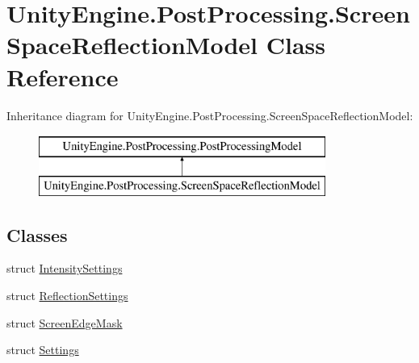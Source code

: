 \hypertarget{class_unity_engine_1_1_post_processing_1_1_screen_space_reflection_model}{}\section{Unity\+Engine.\+Post\+Processing.\+Screen\+Space\+Reflection\+Model Class Reference}
\label{class_unity_engine_1_1_post_processing_1_1_screen_space_reflection_model}
Inheritance diagram for Unity\+Engine.\+Post\+Processing.\+Screen\+Space\+Reflection\+Model\+:\begin{figure}[H]
\begin{center}
\leavevmode
\includegraphics[height=2.000000cm]{class_unity_engine_1_1_post_processing_1_1_screen_space_reflection_model}
\end{center}
\end{figure}
\subsection*{Classes}
\begin{DoxyCompactItemize}
\item 
struct \mbox{\hyperlink{struct_unity_engine_1_1_post_processing_1_1_screen_space_reflection_model_1_1_intensity_settings}{Intensity\+Settings}}
\item 
struct \mbox{\hyperlink{struct_unity_engine_1_1_post_processing_1_1_screen_space_reflection_model_1_1_reflection_settings}{Reflection\+Settings}}
\item 
struct \mbox{\hyperlink{struct_unity_engine_1_1_post_processing_1_1_screen_space_reflection_model_1_1_screen_edge_mask}{Screen\+Edge\+Mask}}
\item 
struct \mbox{\hyperlink{struct_unity_engine_1_1_post_processing_1_1_screen_space_reflection_model_1_1_settings}{Settings}}
\end{DoxyCompactItemize}

